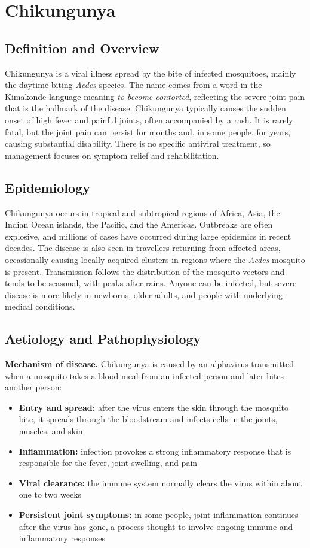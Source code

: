 \chapter{Chikungunya}

\section*{Definition and Overview}
Chikungunya is a viral illness spread by the bite of infected mosquitoes, mainly the daytime-biting \textit{Aedes} species. The name comes from a word in the Kimakonde language meaning \textit{to become contorted}, reflecting the severe joint pain that is the hallmark of the disease. Chikungunya typically causes the sudden onset of high fever and painful joints, often accompanied by a rash. It is rarely fatal, but the joint pain can persist for months and, in some people, for years, causing substantial disability. There is no specific antiviral treatment, so management focuses on symptom relief and rehabilitation.

\section*{Epidemiology}
Chikungunya occurs in tropical and subtropical regions of Africa, Asia, the Indian Ocean islands, the Pacific, and the Americas. Outbreaks are often explosive, and millions of cases have occurred during large epidemics in recent decades. The disease is also seen in travellers returning from affected areas, occasionally causing locally acquired clusters in regions where the \textit{Aedes} mosquito is present. Transmission follows the distribution of the mosquito vectors and tends to be seasonal, with peaks after rains. Anyone can be infected, but severe disease is more likely in newborns, older adults, and people with underlying medical conditions.

\section*{Aetiology and Pathophysiology}
\medskip
\textbf{Mechanism of disease.} Chikungunya is caused by an alphavirus transmitted when a mosquito takes a blood meal from an infected person and later bites another person:
\begin{itemize}
    \item \textbf{Entry and spread:} after the virus enters the skin through the mosquito bite, it spreads through the bloodstream and infects cells in the joints, muscles, and skin
    \item \textbf{Inflammation:} infection provokes a strong inflammatory response that is responsible for the fever, joint swelling, and pain
    \item \textbf{Viral clearance:} the immune system normally clears the virus within about one to two weeks
    \item \textbf{Persistent joint symptoms:} in some people, joint inflammation continues after the virus has gone, a process thought to involve ongoing immune and inflammatory responses
\end{itemize}

